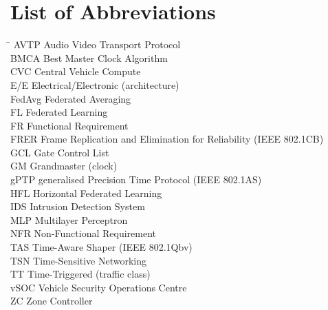 \chapter*{List of Abbreviations}
\begin{tabbing}
\hspace{2.5cm}\= \kill
AVTP \> Audio Video Transport Protocol \\
BMCA \> Best Master Clock Algorithm \\
CVC  \> Central Vehicle Compute \\
E/E  \> Electrical/Electronic (architecture) \\
FedAvg \> Federated Averaging \\
FL \> Federated Learning \\
FR \> Functional Requirement \\
FRER \> Frame Replication and Elimination for Reliability (IEEE 802.1CB) \\
GCL \> Gate Control List \\
GM \> Grandmaster (clock) \\
gPTP \> generalised Precision Time Protocol (IEEE 802.1AS) \\
HFL \> Horizontal Federated Learning \\
IDS \> Intrusion Detection System \\
MLP \> Multilayer Perceptron \\
NFR \> Non-Functional Requirement \\
TAS \> Time-Aware Shaper (IEEE 802.1Qbv) \\
TSN \> Time-Sensitive Networking \\
TT \> Time-Triggered (traffic class) \\
vSOC \> Vehicle Security Operations Centre \\
ZC \> Zone Controller
\end{tabbing}

